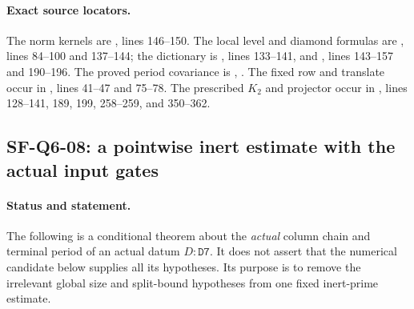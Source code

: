 \documentclass[11pt,a4paper]{article}
\theoremstyle{definition}
\theoremstyle{remark}
\begin{document}
\paragraph{Exact source locators.}
The norm kernels are
,
lines 146--150.  The local level and diamond formulas are
, lines 84--100 and 137--144;
the dictionary is ,
lines 133--141, and
,
lines 143--157 and 190--196.  The proved period covariance is
,
.  The fixed row and translate occur in
, lines 41--47 and
75--78.  The prescribed $K_2$ and projector occur in
,
lines 128--141, 189, 199, 258--259, and 350--362.


\subsection{SF-Q6-08: a pointwise inert estimate with the actual input gates}

\paragraph{Status and statement.}
The following is a conditional theorem about the \emph{actual} column
chain and terminal period of an actual datum $D:\texttt{D7}$.
It does not assert that the numerical candidate below supplies all its
hypotheses.  Its purpose is to remove the irrelevant global size and
split-bound hypotheses from one fixed inert-prime estimate.
\end{document}
